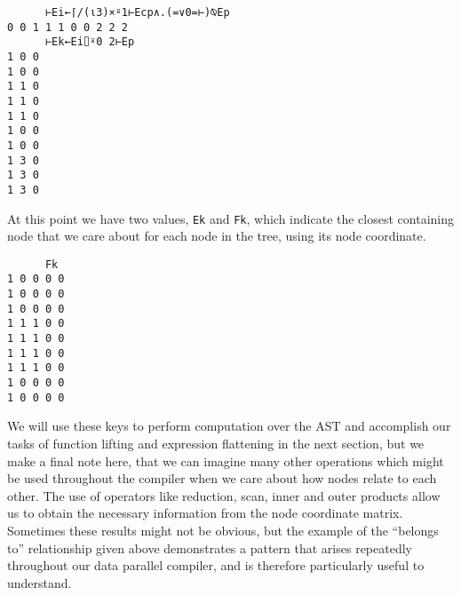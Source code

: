 \documentclass[numbers,preprint]{sigplanconf}
\begin{document}
\begin{verbatim}
      ⊢Ei←⌈/(⍳3)×⍤1⊢Ecp∧.(=∨0=⊢)⍉Ep
0 0 1 1 1 0 0 2 2 2
      ⊢Ek←Ei⌷⍤0 2⊢Ep 
1 0 0
1 0 0
1 1 0
1 1 0
1 1 0
1 0 0
1 0 0
1 3 0
1 3 0
1 3 0
\end{verbatim}

At this point we have two values, \verb;Ek; and \verb;Fk;, which indicate the
closest containing node that we care about for each node in the tree,
using its node coordinate.

\begin{verbatim}
      Fk
1 0 0 0 0
1 0 0 0 0
1 0 0 0 0
1 1 1 0 0
1 1 1 0 0
1 1 1 0 0
1 1 1 0 0
1 0 0 0 0
1 0 0 0 0
\end{verbatim}

We will use these keys to perform computation over the AST and
accomplish our tasks of function lifting and expression flattening in
the next section, but we make a final note here, that we can imagine
many other operations which might be used throughout the compiler when
we care about how nodes relate to each other. The use of operators
like reduction, scan, inner and outer products allow us to obtain
the necessary information from the node coordinate matrix. Sometimes
these results might not be obvious, but the example of the ``belongs
to'' relationship given above demonstrates a pattern that arises
repeatedly throughout our data parallel compiler, and is therefore
particularly useful to understand.
\end{document}
